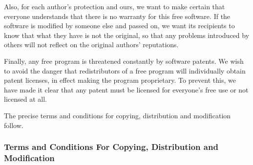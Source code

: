 Also, for each author's protection and ours, we want to make certain that everyone understands that there is no warranty for this free software. If the software is modified by someone else and passed on, we want its recipients to know that what they have is not the original, so that any problems introduced by others will not reflect on the original authors' reputations.

Finally, any free program is threatened constantly by software patents. We wish to avoid the danger that redistributors of a free program will individually obtain patent licenses, in effect making the program proprietary. To prevent this, we have made it clear that any patent must be licensed for everyone's free use or not licensed at all.

The precise terms and conditions for copying, distribution and modification follow.

\subsubsection{Terms and Conditions For Copying, Distribution and Modification}

